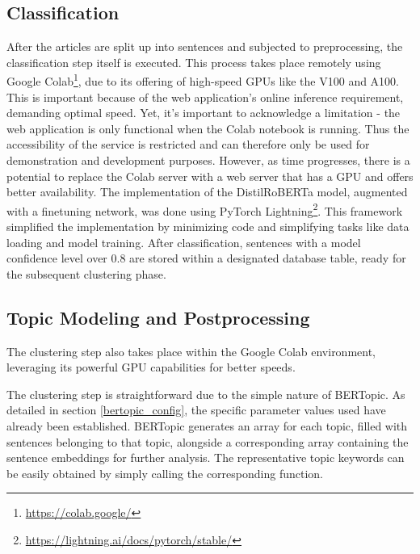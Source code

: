 \documentclass[12pt,oneside,bibtotoc,liststotoc]{scrbook}
\begin{document}
\subsection{Classification}
After the articles are split up into sentences and subjected to preprocessing, the classification step itself is executed. This process takes place remotely using Google Colab\footnote{\url{https://colab.google/}}, due to its offering of high-speed GPUs like the V100 and A100. This is important because of the web application's online inference requirement, demanding optimal speed.
Yet, it's important to acknowledge a limitation - the web application is only functional when the Colab notebook is running. Thus the accessibility of the service is restricted and can therefore only be used for demonstration and development purposes.
However, as time progresses, there is a potential to replace the Colab server with a web server that has a GPU and offers better availability.
The implementation of the DistilRoBERTa model, augmented with a finetuning network, was done using PyTorch Lightning\footnote{\url{https://lightning.ai/docs/pytorch/stable/}}. This framework simplified the implementation by minimizing code and simplifying tasks like data loading and model training.
After classification, sentences with a model confidence level over 0.8 are stored within a designated database table, ready for the subsequent clustering phase.

\subsection{Topic Modeling and Postprocessing}
\label{subsec:clustering}
The clustering step also takes place within the Google Colab environment, leveraging its powerful GPU capabilities for better speeds.

The clustering step is straightforward due to the simple nature of BERTopic. As detailed in section \ref{bertopic_config}, the specific parameter values used have already been established. BERTopic generates an array for each topic, filled with sentences belonging to that topic, alongside a corresponding array containing the sentence embeddings for further analysis. The representative topic keywords can be easily obtained by simply calling the corresponding function.
\end{document}
